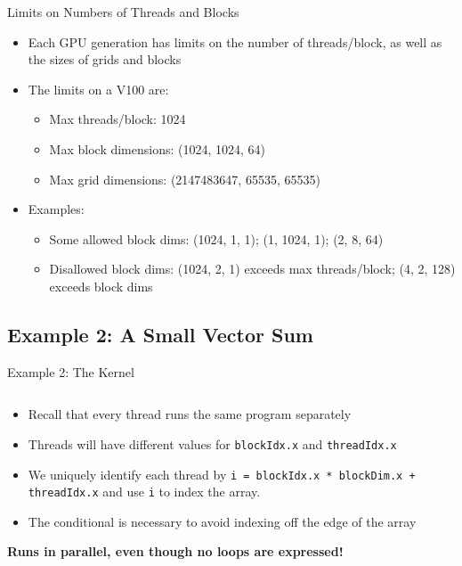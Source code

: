 \documentclass{beamer}
\begin{document}
    \begin{frame}{Limits on Numbers of Threads and Blocks}
        \begin{itemize}
            \item Each GPU generation has limits on the number of threads/block, as well as the sizes of grids and blocks
            \item The limits on a V100 are:
            \begin{itemize}
                \item Max threads/block: 1024
                \item Max block dimensions:  (1024, 1024, 64)
                \item Max grid dimensions: (2147483647, 65535, 65535)
            \end{itemize}
            \item Examples:
            \begin{itemize}
                \item Some allowed block dims:  (1024, 1, 1); (1, 1024, 1); (2, 8, 64)
                \item Disallowed block dims:  (1024, 2, 1) exceeds max threads/block; (4, 2, 128) exceeds block dims
            \end{itemize}
        \end{itemize}
    \end{frame}

    \subsection{Example 2:  A Small Vector Sum}

    \begin{frame}{Example 2:  The Kernel}
        \begin{block}{}
            \inputminted[firstline=6,lastline=11]{cuda}{src/02_vector_add.cu}
        \end{block}
        \begin{itemize}
            \item Recall that every thread runs the same program separately
            \item Threads will have different values for \texttt{blockIdx.x} and \texttt{threadIdx.x}
            \item We uniquely identify each thread by \texttt{i = blockIdx.x * blockDim.x + threadIdx.x} and use \texttt{i} to index the array.
            \item The conditional is necessary to avoid indexing off the edge of the array
        \end{itemize}
        \textbf{Runs in parallel, even though no loops are expressed!}
    \end{frame}
\end{document}
